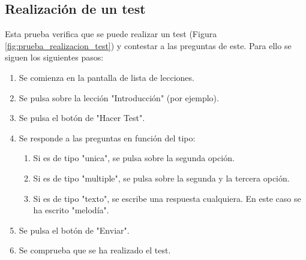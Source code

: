 \subsection{Realización de un test}
Esta prueba verifica que se puede realizar un test (Figura \ref{fig:prueba_realizacion_test}) y contestar a las preguntas de este. Para ello se siguen los siguientes pasos:
\begin{enumerate}
    \item Se comienza en la pantalla de lista de lecciones.
    \item Se pulsa sobre la lección "Introducción" (por ejemplo).
    \item Se pulsa el botón de "Hacer Test".
    \item Se responde a las preguntas en función del tipo:
    \begin{enumerate}
        \item Si es de tipo "unica", se pulsa sobre la segunda opción.
        \item Si es de tipo "multiple", se pulsa sobre la segunda y la tercera opción.
        \item Si es de tipo "texto", se escribe una respuesta cualquiera. En este caso se ha escrito "melodía".
    \end{enumerate}
    \item Se pulsa el botón de "Enviar".
    \item Se comprueba que se ha realizado el test.
\end{enumerate}

